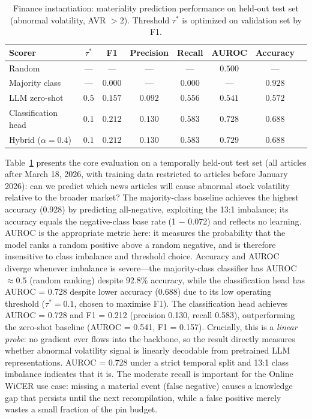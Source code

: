 \documentclass{article}
\begin{document}
\begin{table}[t]
\centering
\caption{Finance instantiation: materiality prediction performance on held-out test set (abnormal volatility, AVR $> 2$). Threshold $\tau^*$ is optimized on validation set by F1.}
\label{tab:voltarget}
\small
\begin{tabular}{@{}lccccccc@{}}
\toprule
\textbf{Scorer} & \textbf{$\tau^*$} & \textbf{F1} & \textbf{Precision} & \textbf{Recall} & \textbf{AUROC} & \textbf{Accuracy} \\
\midrule
Random              & ---  & --- & --- & --- & $0.500$ & --- \\
Majority class      & ---  & $0.000$ & --- & $0.000$ & --- & $0.928$ \\
LLM zero-shot       & $0.5$  & $0.157$  & $0.092$  & $0.556$  & $0.541$ & $0.572$ \\
Classification head & $0.1$  & $\mathbf{0.212}$  & $0.130$  & $0.583$  & $\mathbf{0.728}$ & $0.688$ \\
Hybrid ($\alpha\!=\!0.4$) & $0.1$  & $\mathbf{0.212}$  & $0.130$  & $0.583$  & $\mathbf{0.729}$ & $0.688$ \\
\bottomrule
\end{tabular}
\end{table}

Table~\ref{tab:voltarget} presents the core evaluation on a temporally held-out test set (all articles after March 18, 2026, with training data restricted to articles before January 2026): can we predict which news articles will cause abnormal stock volatility relative to the broader market?
The majority-class baseline achieves the highest accuracy (0.928) by predicting all-negative, exploiting the 13:1 imbalance; its accuracy equals the negative-class base rate (1 $-$ 0.072) and reflects no learning.
AUROC is the appropriate metric here: it measures the probability that the model ranks a random positive above a random negative, and is therefore insensitive to class imbalance and threshold choice.
Accuracy and AUROC diverge whenever imbalance is severe---the majority-class classifier has AUROC $\approx 0.5$ (random ranking) despite 92.8\% accuracy, while the classification head has AUROC = 0.728 despite lower accuracy (0.688) due to its low operating threshold ($\tau^* = 0.1$, chosen to maximise F1).
The classification head achieves AUROC = 0.728 and F1 = 0.212 (precision 0.130, recall 0.583), outperforming the zero-shot baseline (AUROC = 0.541, F1 = 0.157).
Crucially, this is a \emph{linear probe}: no gradient ever flows into the backbone, so the result directly measures whether abnormal volatility signal is linearly decodable from pretrained LLM representations.
AUROC = 0.728 under a strict temporal split and 13:1 class imbalance indicates that it is.
The moderate recall is important for the Online WiCER use case: missing a material event (false negative) causes a knowledge gap that persists until the next recompilation, while a false positive merely wastes a small fraction of the pin budget.
\end{document}
